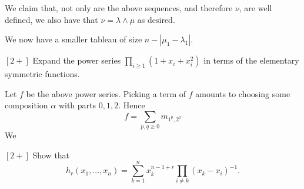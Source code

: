 \documentclass{article}
\begin{document}
We claim that, not only are the above sequences, and therefore $\nu$, are well defined, we also have that $\nu = \lambda \wedge \mu$ as desired.

We now have a smaller tableau of size $n - |\mu_1 - \lambda_1|$.


\begin{exercise}
    $[2+]$
    Expand the power series $\prod_{i\geq1}(1+x_i+x_i^2)$ in terms of the elementary symmetric functions.
\end{exercise}

Let $f$ be the above power series. 
Picking a term of $f$ amounts to choosing some composition $\alpha$ with parts $0,1,2$. Hence
\[
    f = \sum_{p,q \geq 0} m_{1^p,2^q}
\]
We 

\begin{exercise}
    $[2+]$
    Show that
    \[
        h_r(x_1,\ldots,x_n) = \sum_{k=1}^n x_k^{n-1+r}\prod_{i\neq k}(x_k-x_i)^{-1}.
    \]
\end{exercise}
\end{document}
